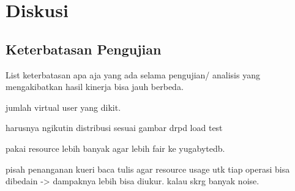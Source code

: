 \section{Diskusi}

\subsection{Keterbatasan Pengujian}

List keterbatasan apa aja yang ada selama pengujian/ analisis yang mengakibatkan hasil kinerja bisa jauh berbeda.

jumlah virtual user yang dikit.

harusnya ngikutin distribusi sesuai gambar drpd load test

pakai resource lebih banyak agar lebih fair ke yugabytedb.

pisah penanganan kueri baca tulis agar resource usage utk tiap operasi bisa dibedain -> dampaknya lebih bisa diukur. kalau skrg banyak noise.
